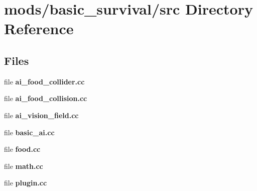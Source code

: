 \section{mods/basic\+\_\+survival/src Directory Reference}
\label{dir_9868faa2fb23232288a0d88082a72ef5}
\subsection*{Files}
\begin{DoxyCompactItemize}
\item 
file {\bfseries ai\+\_\+food\+\_\+collider.\+cc}
\item 
file {\bfseries ai\+\_\+food\+\_\+collision.\+cc}
\item 
file {\bfseries ai\+\_\+vision\+\_\+field.\+cc}
\item 
file {\bfseries basic\+\_\+ai.\+cc}
\item 
file {\bfseries food.\+cc}
\item 
file {\bfseries math.\+cc}
\item 
file {\bfseries plugin.\+cc}
\end{DoxyCompactItemize}
